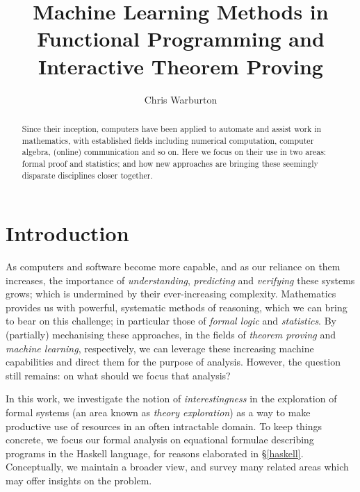 \documentclass[]{article}
\begin{document}
\pagestyle{headings}  %

\title{Machine Learning Methods in Functional Programming and Interactive Theorem Proving}

\author{Chris Warburton}


\maketitle              %

\begin{abstract}
Since their inception, computers have been applied to automate and assist work in mathematics, with established fields including numerical computation, computer algebra, (online) communication and so on. Here we focus on their use in two areas: formal proof and statistics; and how new approaches are bringing these seemingly disparate disciplines closer together.
\end{abstract}

\section{Introduction}

As computers and software become more capable, and as our reliance on them increases, the importance of \emph{understanding}, \emph{predicting} and \emph{verifying} these systems grows; which is undermined by their ever-increasing complexity. Mathematics provides us with powerful, systematic methods of reasoning, which we can bring to bear on this challenge; in particular those of \emph{formal logic} and \emph{statistics}. By (partially) mechanising these approaches, in the fields of \emph{theorem proving} and \emph{machine learning}, respectively, we can leverage these increasing machine capabilities and direct them for the purpose of analysis. However, the question still remains: on what should we focus that analysis?

In this work, we investigate the notion of \emph{interestingness} in the exploration of formal systems (an area known as \emph{theory exploration}) as a way to make productive use of resources in an often intractable domain. To keep things concrete, we focus our formal analysis on equational formulae describing programs in the Haskell language, for reasons elaborated in \S \ref{haskell}. Conceptually, we maintain a broader view, and survey many related areas which may offer insights on the problem.
\end{document}
